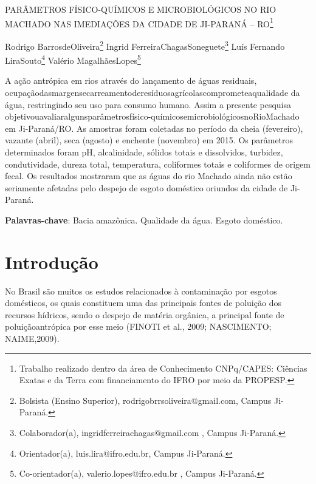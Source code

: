 \documentclass[article,12pt,onesidea,4paper,english,brazil]{abntex2}
\begin{document}
	
	
	\frenchspacing 
	
	\begin{center}
		\LARGE PARÂMETROS FÍSICO-QUÍMICOS E MICROBIOLÓGICOS NO RIO MACHADO NAS IMEDIAÇÕES DA CIDADE DE JI-PARANÁ – RO\footnote{Trabalho realizado dentro da área de Conhecimento CNPq/CAPES: Ciências Exatas e da Terra com financiamento do IFRO por meio da PROPESP.}
		
		\normalsize
		Rodrigo BarrosdeOliveira\footnote{Bolsista (Ensino Superior), rodrigobrrsoliveira@gmail.com, Campus Ji-Paraná.} 
		Ingrid FerreiraChagasSoneguete\footnote{Colaborador(a), ingridferreirachagas@gmail.com , Campus Ji-Paraná.} 
		Luís Fernando LiraSouto\footnote{Orientador(a), luis.lira@ifro.edu.br, Campus Ji-Paraná.} 
		Valério MagalhãesLopes\footnote{Co-orientador(a), valerio.lopes@ifro.edu.br , Campus Ji-Paraná.} 
	\end{center}
	
	\begin{resumoumacoluna}
		A ação antrópica em rios através do lançamento de águas residuais, ocupaçãodasmargensecarreamentoderesíduosagrícolascomprometeaqualidade da água, restringindo seu uso para consumo humano. Assim a presente pesquisa objetivouavaliaralgunsparâmetrosfísico-químicosemicrobiológicosnoRioMachado em Ji-Paraná/RO. As amostras foram coletadas no período da cheia (fevereiro), vazante (abril), seca (agosto) e enchente (novembro) em 2015. Os parâmetros determinados foram pH, alcalinidade, sólidos totais e dissolvidos, turbidez, condutividade, dureza total, temperatura, coliformes totais e coliformes de origem fecal. Os resultados mostraram que as águas do rio Machado ainda não estão seriamente afetadas pelo despejo de esgoto doméstico oriundos da cidade de Ji- Paraná.
		
		\vspace{\onelineskip}
		
		\noindent
		\textbf{Palavras-chave}: Bacia amazônica. Qualidade da água. Esgoto doméstico.
		
	\end{resumoumacoluna}
	
	\textual
	
	\section*{Introdução}
	
No Brasil são muitos os estudos relacionados à contaminação por esgotos domésticos, os quais constituem uma das principais fontes de poluição dos recursos hídricos, sendo o despejo de matéria orgânica, a principal fonte de poluiçãoantrópica por esse meio (FINOTI et al., 2009; NASCIMENTO; NAIME,2009).
\end{document}
